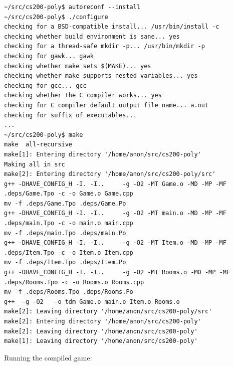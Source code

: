 \documentclass[man,12pt]{apa6}
\begin{document}
\begin{singlespace}
\begin{framed}
\begin{verbatim}~/src/cs200-poly$ autoreconf --install
~/src/cs200-poly$ ./configure
checking for a BSD-compatible install... /usr/bin/install -c
checking whether build environment is sane... yes
checking for a thread-safe mkdir -p... /usr/bin/mkdir -p
checking for gawk... gawk
checking whether make sets $(MAKE)... yes
checking whether make supports nested variables... yes
checking for gcc... gcc
checking whether the C compiler works... yes
checking for C compiler default output file name... a.out
checking for suffix of executables... 
...
~/src/cs200-poly$ make
make  all-recursive
make[1]: Entering directory '/home/anon/src/cs200-poly'
Making all in src
make[2]: Entering directory '/home/anon/src/cs200-poly/src'
g++ -DHAVE_CONFIG_H -I. -I..     -g -O2 -MT Game.o -MD -MP -MF
.deps/Game.Tpo -c -o Game.o Game.cpp
mv -f .deps/Game.Tpo .deps/Game.Po
g++ -DHAVE_CONFIG_H -I. -I..     -g -O2 -MT main.o -MD -MP -MF
.deps/main.Tpo -c -o main.o main.cpp
mv -f .deps/main.Tpo .deps/main.Po
g++ -DHAVE_CONFIG_H -I. -I..     -g -O2 -MT Item.o -MD -MP -MF
.deps/Item.Tpo -c -o Item.o Item.cpp
mv -f .deps/Item.Tpo .deps/Item.Po
g++ -DHAVE_CONFIG_H -I. -I..     -g -O2 -MT Rooms.o -MD -MP -MF
.deps/Rooms.Tpo -c -o Rooms.o Rooms.cpp
mv -f .deps/Rooms.Tpo .deps/Rooms.Po
g++  -g -O2   -o tdm Game.o main.o Item.o Rooms.o  
make[2]: Leaving directory '/home/anon/src/cs200-poly/src'
make[2]: Entering directory '/home/anon/src/cs200-poly'
make[2]: Leaving directory '/home/anon/src/cs200-poly'
make[1]: Leaving directory '/home/anon/src/cs200-poly'
\end{verbatim}
\end{framed}
\end{singlespace}

Running the compiled game:
\end{document}
